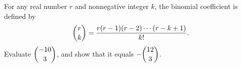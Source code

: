 For any real number $r$ and nonnegative integer $k$, the binomial coefficient is defined by
\[
\dbinom{r}{k}=\dfrac{r(r-1)(r-2)\cdots(r-k+1)}{k!}.
\]
Evaluate $\dbinom{-10}{3}$, and show that it equals $-\dbinom{12}{3}$.
